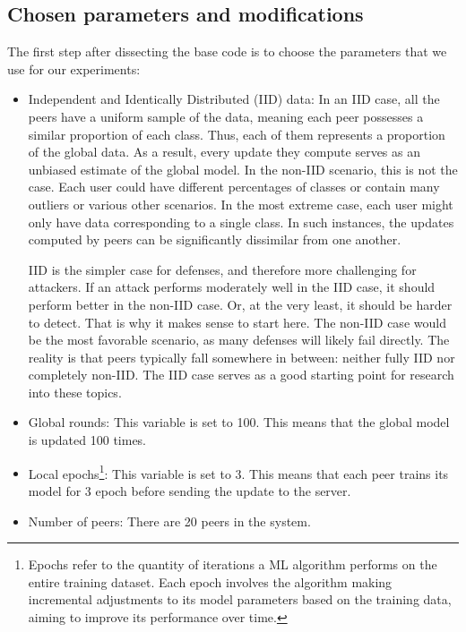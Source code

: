 \subsection{Chosen parameters and modifications}\label{sec:chosen_parameters}
The first step after dissecting the base code \cite{LFighter_code} is to choose the parameters that we use for our experiments:
\begin{itemize}
        \item Independent and Identically Distributed (IID) data: In an IID case, all the peers have a uniform sample of the data, meaning each peer possesses a similar proportion of each class. Thus, each of them represents a proportion of the global data. As a result, every update they compute serves as an unbiased estimate of the global model. In the non-IID scenario, this is not the case. Each user could have different percentages of classes or contain many outliers or various other scenarios. In the most extreme case, each user might only have data corresponding to a single class. In such instances, the updates computed by peers can be significantly dissimilar from one another. 
        
        IID is the simpler case for defenses, and therefore more challenging for attackers. If an attack performs moderately well in the IID case, it should perform better in the non-IID case. Or, at the very least, it should be harder to detect. That is why it makes sense to start here. The non-IID case would be the most favorable scenario, as many defenses will likely fail directly. The reality is that peers typically fall somewhere in between: neither fully IID nor completely non-IID. The IID case serves as a good starting point for research into these topics.
        \item Global rounds: This variable is set to 100. This means that the global model is updated 100 times.
        \item Local epochs\footnote{Epochs refer to the quantity of iterations a ML algorithm performs on the entire training dataset. Each epoch involves the algorithm making incremental adjustments to its model parameters based on the training data, aiming to improve its performance over time.}: This variable is set to 3. This means that each peer trains its model for 3 epoch before sending the update to the server.
        \item Number of peers: There are 20 peers in the system. 
\end{itemize}
